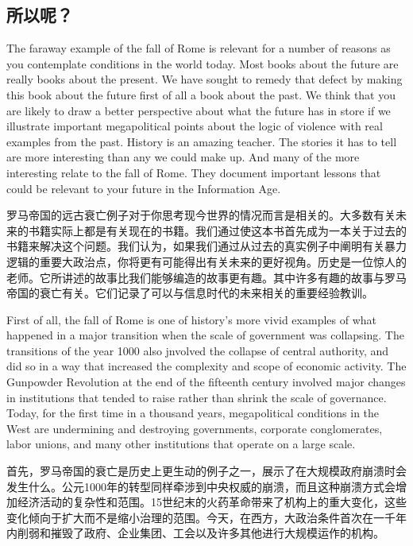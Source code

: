 \subsection{所以呢？} 
\begin{paracol}{2}
The faraway example of the fall of Rome is relevant for a number of reasons as you contemplate conditions in the world today. Most books about the future are really books about the present. We have sought to remedy that defect by making this book about the future first of all a book about the past. We think that you are likely to draw a better perspective about what the future has in store if we illustrate important megapolitical points about the logic of violence with real examples from the past. History is an amazing teacher. The stories it has to tell are more interesting than any we could make up. And many of the more interesting relate to the fall of Rome. They document important lessons that could be relevant to your future in the Information Age.  

\switchcolumn 
罗马帝国的远古衰亡例子对于你思考现今世界的情况而言是相关的。大多数有关未来的书籍实际上都是有关现在的书籍。我们通过使这本书首先成为一本关于过去的书籍来解决这个问题。我们认为，如果我们通过从过去的真实例子中阐明有关暴力逻辑的重要大政治点，你将更有可能得出有关未来的更好视角。历史是一位惊人的老师。它所讲述的故事比我们能够编造的故事更有趣。其中许多有趣的故事与罗马帝国的衰亡有关。它们记录了可以与信息时代的未来相关的重要经验教训。

\switchcolumn*
First of all, the fall of Rome is one of history's more vivid examples of what happened in a major transition when the scale of government was collapsing. The transitions of the year 1000 also jnvolved the collapse of central authority, and did so in a way that increased the complexity and scope of economic activity. The Gunpowder Revolution at the end of the fifteenth century involved major changes in institutions that tended to raise rather than shrink the scale of governance. Today, for the first time in a thousand years, megapolitical conditions in the West are undermining and destroying governments, corporate conglomerates, labor unions, and many other institutions that operate on a large scale.  
  
\switchcolumn
首先，罗马帝国的衰亡是历史上更生动的例子之一，展示了在大规模政府崩溃时会发生什么。公元1000年的转型同样牵涉到中央权威的崩溃，而且这种崩溃方式会增加经济活动的复杂性和范围。15世纪末的火药革命带来了机构上的重大变化，这些变化倾向于扩大而不是缩小治理的范围。今天，在西方，大政治条件首次在一千年内削弱和摧毁了政府、企业集团、工会以及许多其他进行大规模运作的机构。


\end{paracol}
